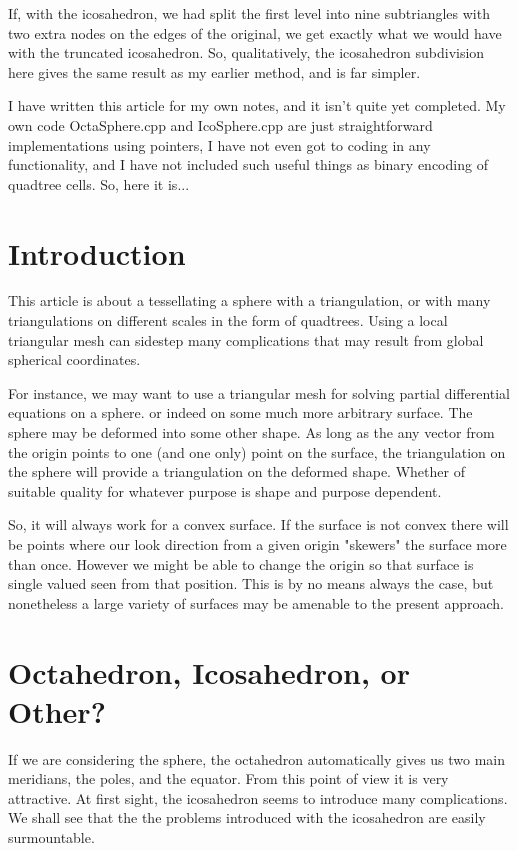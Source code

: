 \documentclass[12pt]{article}
\begin{document}
If, with the icosahedron, we had split the first level into nine subtriangles
 with two extra nodes on the edges of the original, we get exactly what we would
have with the truncated icosahedron. So, qualitatively, the icosahedron
subdivision here gives the same result as my earlier method, and is far simpler.


I have  written this article for my own notes,
 and it isn't quite yet completed. 
My own code OctaSphere.cpp and IcoSphere.cpp 
are  just  straightforward implementations using pointers,
I have not even got to coding in any functionality, and I
have not included such useful things as binary encoding of
quadtree cells. So, here it is...

\section{Introduction}

This article is about a tessellating a sphere with a 
triangulation, or with many triangulations on different scales
in the form of quadtrees. Using a local triangular mesh can sidestep
many complications that may result from global spherical coordinates.

For instance, we may want to use a triangular
mesh for solving partial differential equations on a sphere. or indeed
on some much more arbitrary surface. The sphere
may be deformed into some other shape. As long as the any vector from the
origin points to one (and one only) point on the surface, the triangulation
on the sphere will provide a triangulation on the deformed shape. Whether
of suitable quality for whatever purpose is shape and purpose dependent.

So, it will always work for a convex surface. If the surface is not convex
there will be points where our look direction from a given origin
 "skewers" the surface more than
once. However we might be able to change the origin so that surface is single
valued seen from that position. This is by no means always the 
case, but nonetheless
a large variety of surfaces may be amenable to the present approach.

\section{Octahedron, Icosahedron, or Other?}

If we are considering the sphere, the octahedron automatically gives
us two main meridians, the poles, and the equator. From this point of
view it is very attractive. At first sight, the icosahedron
 seems to introduce many complications. We shall see that the
 the problems introduced with the icosahedron are easily surmountable.
\end{document}

